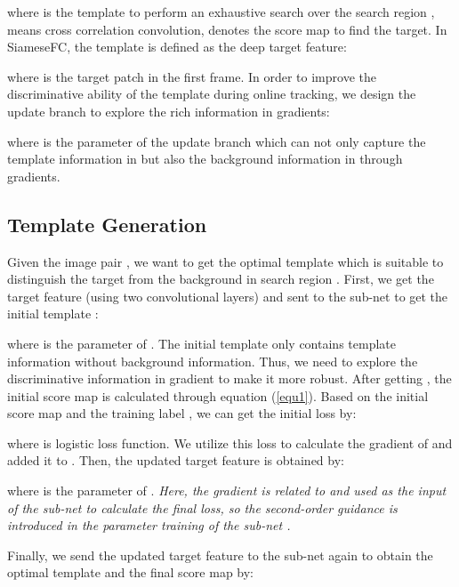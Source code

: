 \documentclass[10pt,twocolumn,letterpaper]{article}
\begin{document}
where  is the template to perform an exhaustive search over the search region ,  means cross correlation convolution,  denotes the score map to find the target.
In SiameseFC, the template  is defined as the deep target feature:

where  is the target patch in the first frame.
In order to improve the discriminative ability of the template  during online tracking, we design the update branch  to explore the rich information in gradients:

where  is the parameter of the update branch
which can not only capture the template information in  but also  the background information in  through gradients.




\subsection{Template Generation}\label{sec::optimizer}




{}
Given the image pair , we want to get the optimal template  which is suitable to distinguish the target from the background in search region . First, we get the target feature  (using two convolutional layers) and sent  to the sub-net  to get the initial template :

where  is the parameter of .
The initial template only contains template information without background information. Thus, we need to explore the discriminative information in gradient to make it more robust.
After getting , the initial score map  is calculated through equation (\ref{equ1}).
\vspace{-3pt}
{}
Based on the initial score map  and the training label , we can get the initial loss  by:

where  is logistic loss function. We utilize this loss to calculate the gradient of  and added it to .
Then, the updated target feature is obtained by:

where  is the parameter of .
\emph{Here, the gradient is related to  and used as the input of the sub-net  to calculate the final loss, so the second-order guidance is introduced in the parameter training of the sub-net .}

\vspace{-3pt}
{}
Finally, we send the updated target feature  to
the sub-net  again to obtain the optimal template  and the final score map  by:
\end{document}
